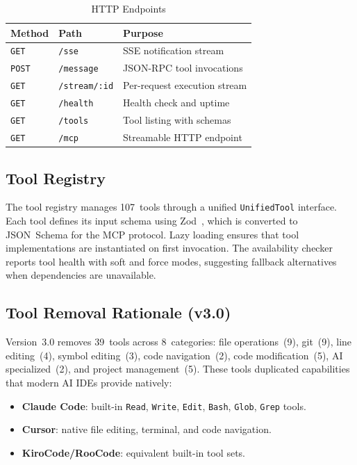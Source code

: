 \documentclass[journal,10pt]{IEEEtran}
\newcommand{\code}[1]{\texttt{#1}}
\begin{document}
\begin{table}[!t]
\centering
\caption{HTTP Endpoints}
\label{tab:endpoints}
\begin{tabular}{@{}llp{32mm}@{}}
\toprule
\textbf{Method} & \textbf{Path} & \textbf{Purpose} \\
\midrule
\texttt{GET}  & \texttt{/sse}        & SSE notification stream \\
\texttt{POST} & \texttt{/message}    & JSON-RPC tool invocations \\
\texttt{GET}  & \texttt{/stream/:id} & Per-request execution stream \\
\texttt{GET}  & \texttt{/health}     & Health check and uptime \\
\texttt{GET}  & \texttt{/tools}      & Tool listing with schemas \\
\texttt{GET}  & \texttt{/mcp}        & Streamable HTTP endpoint \\
\bottomrule
\end{tabular}
\end{table}

\subsection{Tool Registry}

The tool registry manages 107~tools through a unified \code{UnifiedTool} interface. Each tool defines its input schema using Zod~\cite{zod}, which is converted to JSON~Schema for the MCP protocol. Lazy loading ensures that tool implementations are instantiated on first invocation. The availability checker reports tool health with soft and force modes, suggesting fallback alternatives when dependencies are unavailable.

\subsection{Tool Removal Rationale (v3.0)}
\label{sec:removal}

Version~3.0 removes 39~tools across 8~categories: file operations~(9), git~(9), line editing~(4), symbol editing~(3), code navigation~(2), code modification~(5), AI specialized~(2), and project management~(5). These tools duplicated capabilities that modern AI IDEs provide natively:

\begin{itemize}[nosep]
\item \textbf{Claude Code}: built-in \code{Read}, \code{Write}, \code{Edit}, \code{Bash}, \code{Glob}, \code{Grep} tools.
\item \textbf{Cursor}: native file editing, terminal, and code navigation.
\item \textbf{KiroCode/RooCode}: equivalent built-in tool sets.
\end{itemize}
\end{document}
